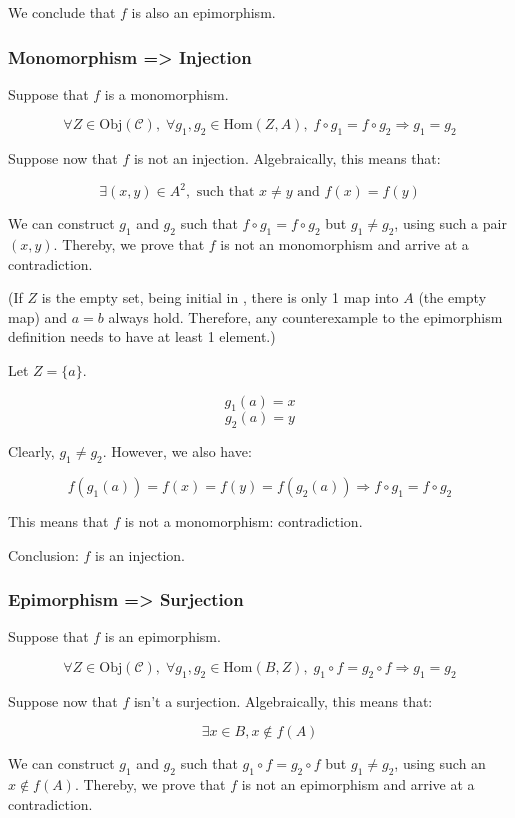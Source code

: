 \documentclass[12pt, letterpaper, twoside]{article}
\begin{document}
We conclude that $f$ is also an epimorphism.


\subsubsection{Monomorphism => Injection}

Suppose that $f$ is a monomorphism.

$$
\forall Z \in \text{Obj}(\mathcal{C}), \;
\forall g_1, g_2 \in \text{Hom}(Z, A), \;
f \circ g_1 = f \circ g_2 \Rightarrow g_1 = g_2
$$

Suppose now that $f$ is not an injection. Algebraically, this means that:

$$\exists (x, y) \in A^2, \text{ such that } x \neq y \text{ and } f(x) = f(y)$$

We can construct $g_1$ and $g_2$ such that $f \circ g_1 = f \circ g_2$ but $g_1 \neq g_2$, using such a pair $(x, y)$. Thereby, we prove that $f$ is not an monomorphism and arrive at a contradiction.

(If $Z$ is the empty set, being initial in , there is only 1 map into $A$ (the empty map) and $a = b$ always hold. Therefore, any counterexample to the epimorphism definition needs to have at least 1 element.)

Let $Z = \{a\}$.

$$g_1(a) = x$$
$$g_2(a) = y$$

Clearly, $g_1 \neq g_2$. However, we also have:

$$
f(g_1(a)) = f(x) = f(y) = f(g_2(a)) \Rightarrow
f \circ g_1 = f \circ g_2
$$

This means that $f$ is not a monomorphism: contradiction.

Conclusion: $f$ is an injection.


\subsubsection{Epimorphism => Surjection}

Suppose that $f$ is an epimorphism.

$$
\forall Z \in \text{Obj}(\mathcal{C}), \;
\forall g_1, g_2 \in \text{Hom}(B, Z), \;
g_1 \circ f = g_2 \circ f \Rightarrow g_1 = g_2
$$

Suppose now that $f$ isn't a surjection. Algebraically, this means that:

$$\exists x \in B, x \notin f(A)$$

We can construct $g_1$ and $g_2$ such that $g_1 \circ f = g_2 \circ f$ but $g_1 \neq g_2$, using such an $x \notin f(A)$. Thereby, we prove that $f$ is not an epimorphism and arrive at a contradiction.
\end{document}
